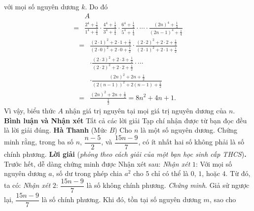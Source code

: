 \begin{multicols}{2}
	với mọi số nguyên dương $k$.
	\vskip 0.05cm
	Do đó
	\begin{align*}
			&A \\[-0.6ex]
			= &\frac{{{2^4} \!+\! \frac{1}{4}}}{{{1^4} \!+\! \frac{1}{4}}} \!\cdot\! \frac{{{4^4} \!+\! \frac{1}{4}}}{{{3^4} \!+\! \frac{1}{4}}} \!\cdot\! \frac{{{6^4} \!+\! \frac{1}{4}}}{{{5^4} \!+\! \frac{1}{4}}} \cdot  \cdots  \cdot \frac{{{{\left( {2n} \right)}^4} \!+\! \frac{1}{4}}}{{{{\left( {2n \!-\! 1} \right)}^4} \!+\! \frac{1}{4}}}
		\end{align*}
			\begin{align*}
			 = &\frac{{{{\left( {2 \cdot 1} \right)}^2} + 2 \cdot 1 + \frac{1}{2}}}{{{{\left( {2 \cdot 0} \right)}^2} + 2 \cdot 0 + \frac{1}{2}}} \cdot \frac{{{{\left( {2 \cdot 2} \right)}^2} + 2 \cdot 2 + \frac{1}{2}}}{{{{\left( {2 \cdot 1} \right)}^2} + 2 \cdot 1 + \frac{1}{2}}} \\
			 &\cdot \frac{{{{\left( {2 \cdot 3} \right)}^2} + 2 \cdot 3 + \frac{1}{2}}}{{{{\left( {2 \cdot 2} \right)}^2} + 2 \cdot 2 + \frac{1}{2}}} \cdot  \cdots  \\
			 &\cdot \frac{{{{\left( {2n} \right)}^2} + 2n + \frac{1}{2}}}{{{{\left( {2\left( {n - 1} \right)} \right)}^2} + 2\left( {n - 1} \right) + \frac{1}{2}}}\\
			 = &\frac{{{{\left( {2n} \right)}^2} + 2n + \frac{1}{2}}}{{\frac{1}{2}}} = 8{n^2} + 4n + 1.
	\end{align*}
	Vì vậy, biểu thức $A$ nhận giá trị nguyên tại mọi giá trị nguyên dương của $n$.
	\vskip 0.05cm
	\textbf{\color{thachthuctoanhoc}Bình luận và Nhận xét}
	\vskip 0.05cm
	Tất cả các lời giải Tạp chí nhận được từ bạn đọc đều là lời giải đúng.
	\vskip 0.05cm
	\hfill	\textbf{\color{thachthuctoanhoc}Hà Thanh}
	\vskip 0.05cm
	{}
	(Mức $B$) Cho $n$ là một số nguyên dương. Chứng minh rằng, trong ba số $n$,  $\dfrac{n-5}2$, và $\dfrac{15n-9}7$, có ít nhất hai số không phải là số chính phương.
	\vskip 0.05cm
	\textbf{\color{thachthuctoanhoc}Lời giải} (\textit{phỏng theo cách giải của một bạn học sinh cấp THCS})\textbf{\color{thachthuctoanhoc}.}
	\vskip 0.05cm
	Trước hết, dễ dàng chứng minh được Nhận xét sau:
	\vskip 0.05cm
	\textit{Nhận xét} $1$: Với mọi số nguyên dương $a$, số dư trong phép chia $a^2$  cho $5$ chỉ có thể là $0$, $1$, hoặc $4$.
	\vskip 0.05cm
	Từ đó, ta có:
	\vskip 0.05cm
	\textit{Nhận xét} $2$: $\dfrac{15n-9}{7}$  là số không chính phương.
	\vskip 0.05cm
	\textit{Chứng minh}. Giả sử ngược lại, $\dfrac{15n-9}{7}$  là số chính phương.
	\vskip 0.05cm
	Khi đó, tồn tại số nguyên dương $m$, sao cho

\end{multicols}
